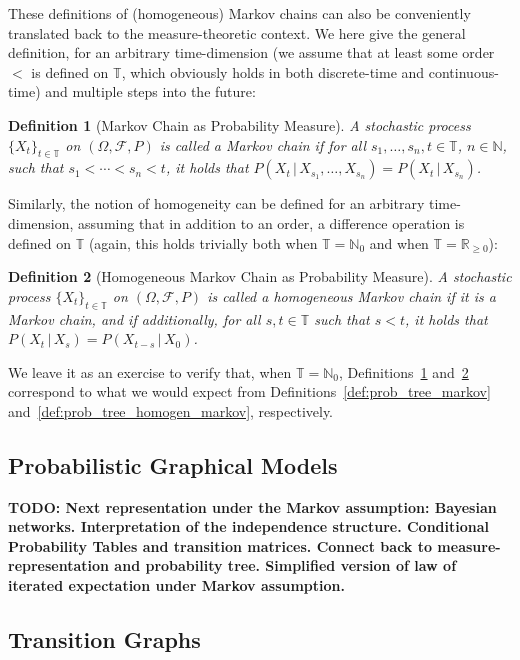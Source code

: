 \documentclass[11pt]{book}
\newtheorem{definition}{Definition}
\newcommand{\nats}{\mathbb{N}}
\newcommand{\natswith}{\nats_{0}}
\newcommand{\reals}{\mathbb{R}}
\newcommand{\realsnonneg}{\reals_{\geq 0}}
\newcommand{\timedim}{\mathbb{T}}
\begin{document}
These definitions of (homogeneous) Markov chains can also be conveniently translated back to the measure-theoretic context. We here give the general definition, for an arbitrary time-dimension (we assume that at least some order $<$ is defined on $\timedim$, which obviously holds in both discrete-time and continuous-time) and multiple steps into the future:
\begin{definition}[Markov Chain as Probability Measure]\label{def:measure_markov}
A stochastic process $\{X_t\}_{t\in\timedim}$ on $(\Omega,\mathcal{F},P)$ is called a Markov chain if for all $s_1,\ldots,s_n,t\in\timedim$, $n\in\nats$, such that $s_1<\cdots<s_n<t$, it holds that $P(X_t\,\vert\,X_{s_1},\ldots,X_{s_n}) = P(X_t\,\vert\,X_{s_n})$.
\end{definition}
Similarly, the notion of homogeneity can be defined for an arbitrary time-dimension, assuming that in addition to an order, a difference operation is defined on $\timedim$ (again, this holds trivially both when $\timedim=\natswith$ and when $\timedim=\realsnonneg$):  
\begin{definition}[Homogeneous Markov Chain as Probability Measure]\label{def:measure_homogen_markov}
A stochastic process $\{X_t\}_{t\in\timedim}$ on $(\Omega,\mathcal{F},P)$ is called a homogeneous Markov chain if it is a Markov chain, and if additionally, for all $s,t\in\timedim$ such that $s<t$, it holds that $P(X_t\,\vert\,X_s)=P(X_{t-s}\,\vert\,X_0)$.
\end{definition}
We leave it as an exercise to verify that, when $\timedim=\natswith$, Definitions~\ref{def:measure_markov} and~\ref{def:measure_homogen_markov} correspond to what we would expect from Definitions~\ref{def:prob_tree_markov} and~\ref{def:prob_tree_homogen_markov}, respectively.

\subsection{Probabilistic Graphical Models}

{\bf TODO: Next representation under the Markov assumption: Bayesian networks. Interpretation of the independence structure. Conditional Probability Tables and transition matrices. Connect back to measure-representation and probability tree. Simplified version of law of iterated expectation under Markov assumption. }

\subsection{Transition Graphs}
\end{document}
